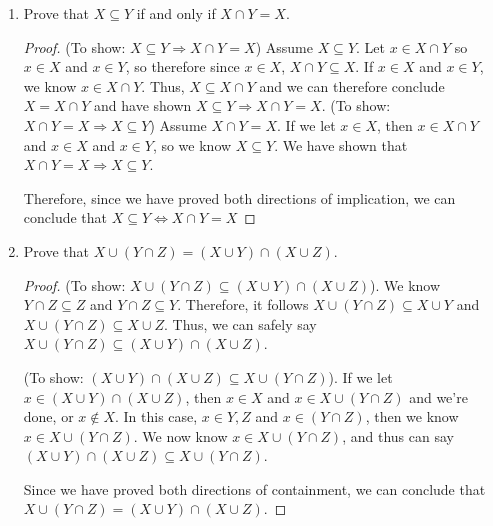 \documentclass[12pt]{article}
\begin{document}
\begin{enumerate}
\item Prove that $X\subseteq Y$ if and only if $X\cap Y = X$.
\begin{proof}
(To show: $X \subseteq Y \Rightarrow X \cap Y = X$) Assume $X \subseteq Y$. Let $x \in X \cap Y$ so $x \in X$ and $x \in Y$, so therefore since $x \in X$, $X \cap Y \subseteq X$. If $x \in X$ and $x \in Y$, we know $x \in X \cap Y$. Thus, $X \subseteq X \cap Y$ and we can therefore conclude $X = X \cap Y$ and have shown $X \subseteq Y \Rightarrow X \cap Y = X$.  \hfill \break \break
(To show: $X \cap Y = X \Rightarrow X \subseteq Y$)
 Assume $X \cap Y = X$. If we let $x \in X$, then $x \in X \cap Y$ and $x \in X$ and $x \in Y$, so we know $X \subseteq Y$. We have shown that $X \cap Y = X \Rightarrow X \subseteq Y$. \hfill \break 

Therefore, since we have proved both directions of implication, we can conclude that $X\subseteq Y \iff X\cap Y = X$
\end{proof}

\item Prove that $X\cup(Y\cap Z) = (X\cup Y)\cap (X\cup Z)$.

\begin{proof}
(To show: $X\cup(Y\cap Z) \subseteq (X\cup Y)\cap (X\cup Z)$). We know $Y \cap Z \subseteq Z$ and $Y \cap Z \subseteq Y$. Therefore, it follows $X\cup(Y\cap Z) \subseteq X \cup Y$ and $X\cup(Y\cap Z) \subseteq X \cup Z$. Thus, we can safely say $X\cup(Y\cap Z)\subseteq (X \cup Y) \cap (X \cup Z)$. \hfill \break

(To show: $(X\cup Y)\cap (X\cup Z) \subseteq X\cup(Y\cap Z)$). If we let $x \in (X\cup Y)\cap (X\cup Z)$, then $x \in X$ and $x \in X\cup(Y\cap Z)$ and we're done, or $x \notin X$. In this case, $x \in Y, Z$ and $x \in (Y \cap Z)$, then we know $x \in X\cup(Y\cap Z)$. We now know $x \in X\cup(Y\cap Z)$, and thus can say $(X\cup Y)\cap (X\cup Z) \subseteq X\cup(Y\cap Z)$. \hfill \break  

Since we have proved both directions of containment, we can conclude that $X\cup(Y\cap Z) = (X\cup Y)\cap (X\cup Z)$.
\end{proof}
\end{enumerate}
\end{document}

